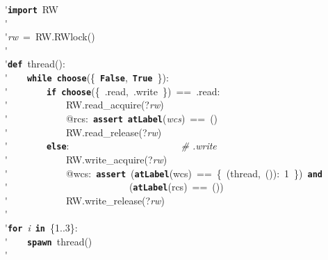 \'\>\texttt{\textbf{import}}~RW\\

\'\>\\

\'\>\textit{rw}~=~RW.RWlock()\\

\'\>\\

\'\>\texttt{\textbf{def}}~thread():\\

\'\>~~~~\texttt{\textbf{while}}~\texttt{\textbf{choose}}(\{~\texttt{\textbf{False}},~\texttt{\textbf{True}}~\}):\\

\'\>~~~~~~~~\texttt{\textbf{if}}~\texttt{\textbf{choose}}(\{~.read,~.write~\})~==~.read:\\

\'\>~~~~~~~~~~~~RW.read\_acquire(?\textit{rw})\\

\'\>~~~~~~~~~~~~@rcs:~\texttt{\textbf{assert}}~\texttt{\textbf{atLabel}}(\textit{wcs})~==~()\\

\'\>~~~~~~~~~~~~RW.read\_release(?\textit{rw})\\

\'\>~~~~~~~~\texttt{\textbf{else}}:~~~~~~~~~~~~~~~~~~~~~~~\emph{\# .write}\\

\'\>~~~~~~~~~~~~RW.write\_acquire(?\textit{rw})\\

\'\>~~~~~~~~~~~~@wcs:~\texttt{\textbf{assert}}~(\texttt{\textbf{atLabel}}(wcs)~==~\{~(thread,~()):~1~\})~\texttt{\textbf{and}}\\

\'\>~~~~~~~~~~~~~~~~~~~~~~~~~(\texttt{\textbf{atLabel}}(rcs)~==~())\\

\'\>~~~~~~~~~~~~RW.write\_release(?\textit{rw})\\

\'\>\\

\'\>\texttt{\textbf{for}}~\textit{i}~\texttt{\textbf{in}}~\{1..3\}:\\

\'\>~~~~\texttt{\textbf{spawn}}~thread()\\

\'\>